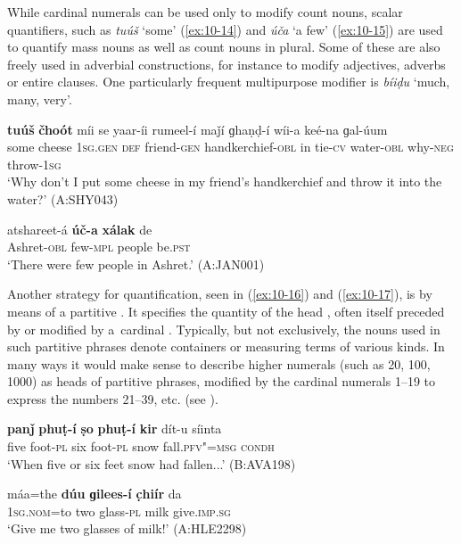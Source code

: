 While cardinal numerals can be used only to modify count nouns, scalar quantifiers, such as \textit{tuúš} `some' (\ref{ex:10-14}) and \textit{úča} `a few' (\ref{ex:10-15}) are used to quantify mass nouns as well as count nouns in plural. Some of these are also freely used in adverbial constructions, for instance to modify adjectives, adverbs or entire clauses. One particularly frequent multipurpose modifier is \textit{bíiḍu} `much, many, very'.

\ea
\label{ex:10-14}
\gll \textbf{tuúš} \textbf{čhoót} míi se yaar-íi rumeel-í maǰí ɡhaṇḍ-í wíi-a keé-na ɡal-úum\\
some cheese \textsc{1sg.gen} \textsc{def} friend-\textsc{gen} handkerchief-\textsc{obl}  in tie-\textsc{cv} water-\textsc{obl} why-\textsc{neg} throw-\textsc{1sg} \\
\glt `Why don't I put some cheese in my friend's handkerchief and throw it into the water?' (A:SHY043)

\ex
\label{ex:10-15}
\gll atshareet-á \textbf{úč-a} \textbf{xálak} de \\
Ashret-\textsc{obl} few-\textsc{mpl} people be.\textsc{pst}\\
\glt `There were few people in Ashret.' (A:JAN001)
\z


Another strategy for quantification, seen in (\ref{ex:10-16}) and (\ref{ex:10-17}), is by means of a partitive  . It specifies the quantity of the head , often itself preceded by or modified by a~cardinal . Typically, but not exclusively, the nouns used in such partitive phrases denote containers or measuring terms of various kinds. In many ways it would make sense to describe higher numerals (such as 20, 100, 1000) as heads of partitive phrases, modified by the cardinal numerals 1--19 to express the numbers 21--39, etc. (see ).

\begin{exe}
\ex
\label{ex:10-16}
\gll \textbf{panǰ} \textbf{phuṭ-í} \textbf{ṣo} \textbf{phuṭ-í} \textbf{kir} dít-u síinta \\
five foot-\textsc{pl} six foot-\textsc{pl} snow fall.\textsc{pfv"=msg} \textsc{condh} \\
\glt `When five or six feet snow had fallen...' (B:AVA198)

\ex
\label{ex:10-17}
\gll máa=the \textbf{dúu} \textbf{ɡilees-í} \textbf{c̣hiír} da \\
\textsc{1sg}.\textsc{nom}=to two glass-\textsc{pl} milk give.\textsc{imp.sg} \\
\glt `Give me two glasses of milk!' (A:HLE2298)
\end{exe}


